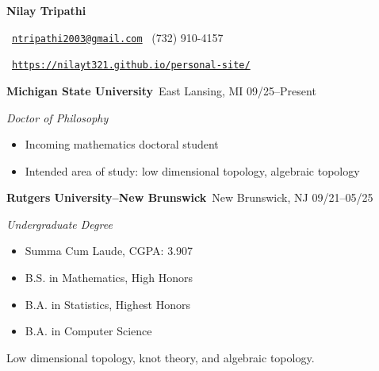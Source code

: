 \documentclass[11pt]{article}
\begin{document}
		\begin{center}
				\noindent \textbf{\Large Nilay Tripathi}
		\end{center}
		\noindent \faEnvelope\ \href{mailto:ntripathi2003@gmail.com}{\texttt{ntripathi2003@gmail.com}} \hfill \faPhone\ (732) 910-4157 \noindent \vspace{0.5em} 

		\noindent \faUser\ \href{https://nilayt321.github.io/personal-site/}{\texttt{https://nilayt321.github.io/personal-site/}} \noindent \vspace{1.0em}

		\noindent \textbf{Michigan State University}\ East Lansing, MI \hfill 09/25--Present \par 
		\noindent \emph{Doctor of Philosophy} 
		\begin{itemize}
				\item Incoming mathematics doctoral student 
				\item Intended area of study: low dimensional topology, algebraic topology
		\end{itemize}
		\entryspace

		\noindent \textbf{Rutgers University--New Brunswick}\ New Brunswick, NJ \hfill 09/21--05/25 \par
		\noindent \emph{Undergraduate Degree} \par
		\begin{itemize}
				\item Summa Cum Laude, CGPA: 3.907
				\item B.S. in Mathematics, High Honors 
				\item B.A. in Statistics, Highest Honors
				\item B.A. in Computer Science
		\end{itemize}
		\entryspace

		\noindent Low dimensional topology, knot theory, and algebraic topology. 
		\entryspace 
\end{document}
